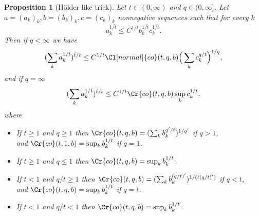 \documentclass{amsart}
\newtheorem{proposition}[theorem]{Proposition}
\theoremstyle{definition}
\newcommand{\Cll}[2][normal]{\Cl[#1]{#2}}
\newcommand{\Crr}[1]{\Cr{#1}}
\begin{document}
\begin{proposition}[H\"older-like trick] \label{holder}Let $t\in (0, \infty)$ and $q\in (0,\infty]$. Let $a=(a_k)_k, b=(b_k)_k,c=(c_k)_k$ nonnegative   sequences  such that for every $k$
$$a_k^{1/\hat{t}} \leq C^{1/\hat{t}} b_k^{1/\hat{t}}c_k^{1/\hat{t}}.$$
Then if $q< \infty$ we have
$$(\sum_k a_k^{1/\hat{t}})^{\hat{t}/t} \leq  C^{1/t} \Cll{co}(t,q,b)\Big(  \sum_k c_k^{q/t}\Big)^{1/q},$$
and if  $q=\infty$ 
$$(\sum_k a_k^{1/\hat{t}})^{\hat{t}/t} \leq  C^{1/t} \Crr{co}(t,q,b)\sup_k c_k^{1/t}.$$
where  
\begin{itemize} 
\item[A.] If $t\geq 1$ and $q\geq 1$ then $\Crr{co}(t,q,b)=(\sum_k b_k^{q'/t})^{1/q'} $ if  $q > 1$, \\ and  $\Crr{co}(t,1,b)=\sup_k b_k^{1/t}$  if  $q=1$.
\item[B.] If $t\geq 1$ and $q\leq  1$ then $\Crr{co}(t,q,b)=\sup_k b_k^{1/t}$.
\item[C.] If $t< 1$ and $q/t\geq 1$ then $\Crr{co}(t,q,b)=(\sum_k b_k^{(q/t)'})^{1/(t(q/t)')} $ if $q< t$, \\ and 
$\Crr{co}(t,q,b)=\sup_k b_k^{1/t}$ if $q=t$. 
\item[D.] If $t< 1$ and $q/t<   1$ then $\Crr{co}(t,q,b)= \sup_k b_k^{1/t} $.
\end{itemize}

\end{proposition}  
\end{document}
